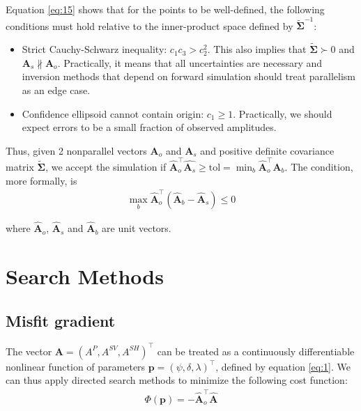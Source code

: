 \documentclass[preprint]{seismica}
\begin{document}
    Equation \ref{eq:15} shows that for the points to be well-defined, the following conditions
    must hold relative to the inner-product space defined by $\tilde{\bm{\Sigma}}^{-1}$:
    
    \begin{itemize}
      \item Strict Cauchy-Schwarz inequality: $c_1c_3 > c_2^2$. This also implies that
        $\tilde{\bm{\Sigma}} \succ 0$ and $\bm{A}_s \nparallel \bm{A}_o$. Practically, it means that all
        uncertainties are necessary and inversion methods that depend on forward simulation should
        treat parallelism as an edge case.
      \item Confidence ellipsoid cannot contain origin: $c_1 \geq 1$. Practically, we should expect
      errors to be a small fraction of observed amplitudes.
    \end{itemize}

    Thus, given 2 nonparallel vectors $\bm{A}_o$ and $\bm{A}_s$ and positive definite covariance
    matrix $\tilde{\bm{\Sigma}}$, we accept the simulation if $\hat{\bm{A}}_o^\top \hat{\bm{A}_s} \geq \text{tol} 
    = \min_b \hat{\bm{A}}_o^\top \hat{\bm{A}_b}$. The condition, more formally, is
    \begin{align} \label{eq:16}
      \max_b \hat{\bm{A}}_o^\top (\hat{\bm{A}}_b - \hat{\bm{A}}_s) \leq 0
    \end{align}

    \noindent where $\hat{\bm{A}}_o$, $\hat{\bm{A}}_s$ and $\hat{\bm{A}}_b$ are unit vectors.


\section{Search Methods} \label{sec:algorithms}
  
  \subsection{Misfit gradient}
    The vector $\bm{A} = (A^P, A^{SV}, A^{SH})^\top$ can be treated as a continuously differentiable 
    nonlinear function of parameters $\bm{p} = (\psi, \delta, \lambda)^\top$, defined by equation 
    \ref{eq:1}. We can thus apply directed search methods to minimize the following cost function:
    \begin{align} \label{eq:17}
      \Phi(\bm{p}) = -\hat{\bm{A}}_o^\top \hat{\bm{A}}
    \end{align}
\end{document}
